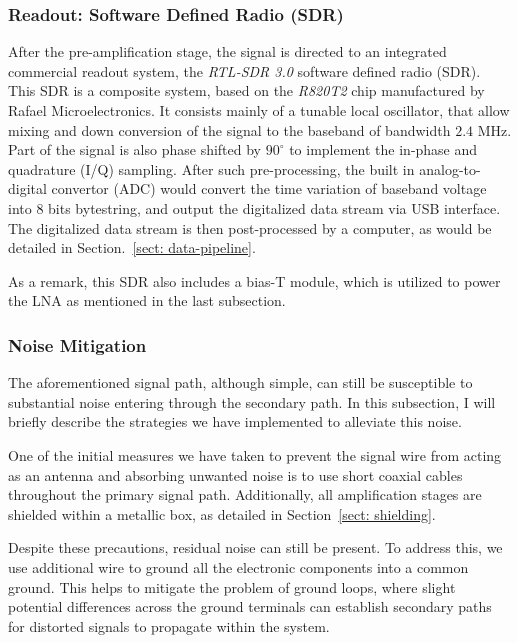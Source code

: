 \documentclass[12pt]{article}
\begin{document}
    \subsubsection{Readout: Software Defined Radio (SDR)}
    After the pre-amplification stage, the signal is directed to an integrated commercial readout system, the \textit{RTL-SDR 3.0} software defined radio (SDR). \cite{rtl-sdr-datasheet}
    This SDR is a composite system, based on the \textit{R820T2} chip manufactured by Rafael Microelectronics. 
    It consists mainly of a tunable local oscillator, that allow mixing and down conversion of the signal to the baseband of bandwidth $2.4$ MHz. 
    Part of the signal is also phase shifted by $90^\circ$ to implement the in-phase and quadrature (I/Q) sampling. 
    After such pre-processing, the built in analog-to-digital convertor (ADC) would convert the time variation of baseband voltage into $8$ bits bytestring, and output the digitalized data stream via USB interface. 
    The digitalized data stream is then post-processed by a computer, as would be detailed in Section.~\ref{sect: data-pipeline}.

    As a remark, this SDR also includes a bias-T module, which is utilized to power the LNA as mentioned in the last subsection.
    
    \subsubsection{Noise Mitigation}
    The aforementioned signal path, although simple, can still be susceptible to substantial noise entering through the secondary path. 
    In this subsection, I will briefly describe the strategies we have implemented to alleviate this noise.

    One of the initial measures we have taken to prevent the signal wire from acting as an antenna and absorbing unwanted noise is to use short coaxial cables throughout the primary signal path. 
    Additionally, all amplification stages are shielded within a metallic box, as detailed in Section~\ref{sect: shielding}.
    
    Despite these precautions, residual noise can still be present. To address this, we use additional wire to ground all the electronic components into a common ground. 
    This helps to mitigate the problem of ground loops, where slight potential differences across the ground terminals can establish secondary paths for distorted signals to propagate within the system.
    
\end{document}
